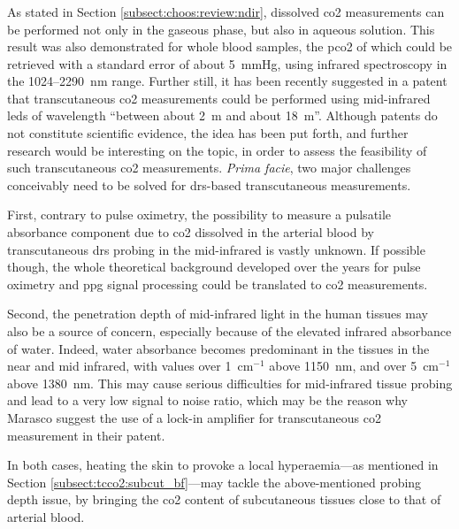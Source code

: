 \subsubsection{\texorpdfstring{}{DRS}}\label{subsect:choos:pot:drs}

As stated in Section \ref{subsect:choos:review:ndir}, dissolved \gls{co2} measurements can be performed not only in the gaseous phase, but also in aqueous solution\cite{schaden2004}. This result was also demonstrated for whole blood samples, the \gls{pco2} of which could be retrieved with a standard error of about 5~mmHg, using infrared spectroscopy in the 1024--2290~nm range\cite{domjan1994}. Further still, it has been recently suggested in a patent that transcutaneous \gls{co2} measurements could be performed using mid-infrared \glspl{led} of wavelength \enquote{between about 2~\textmu{}m and about 18~\textmu{}m}\cite{marasco2020}. Although patents do not constitute scientific evidence\cite{freilich2019}, the idea has been put forth, and \mfrin{}further research would be interesting on the topic, in order to assess the feasibility of such transcutaneous \gls{co2} measurements. \emph{Prima facie}, two major challenges conceivably need to be solved for \gls{drs}-based transcutaneous measurements.

First, contrary to pulse oximetry, the possibility to measure a pulsatile absorbance component due to \gls{co2} dissolved in the arterial blood by transcutaneous \gls{drs} probing in the mid-infrared is vastly unknown. If possible though, the whole theoretical background developed over the years for pulse oximetry and \gls{ppg} signal processing\cite{tamura2019} could be translated to \gls{co2} measurements.

Second, the penetration depth of mid-infrared light in the human tissues may also be a source of concern, especially because of the elevated infrared absorbance of water. Indeed, water absorbance becomes predominant in the tissues in the near and mid infrared\cite{jacques2013}, with values over 1~cm$^{-1}$ above 1150~nm, and over 5~cm$^{-1}$ above 1380~nm\cite{kou1993}. This may cause serious difficulties for mid-infrared tissue probing and lead to a very low signal to noise ratio, which may be the reason why Marasco \etal{} suggest the use of a lock-in amplifier for transcutaneous \gls{co2} measurement in their patent\cite{marasco2020}.

In both cases, heating the skin to provoke a local hyperaemia---as mentioned in Section \ref{subsect:tcco2:subcut_bf}---may tackle the above-mentioned probing depth issue, by bringing the \gls{co2} content of subcutaneous tissues close to that of arterial blood.

